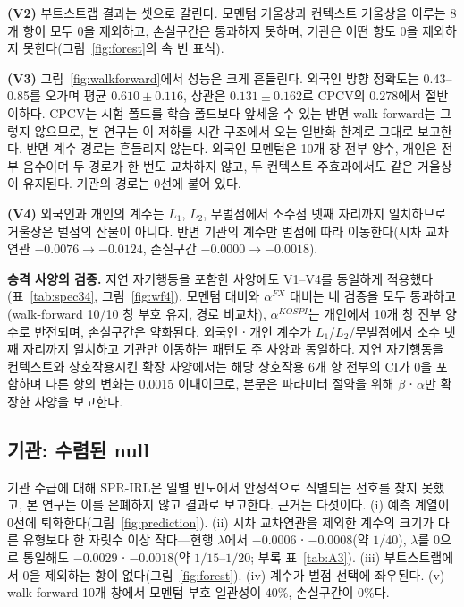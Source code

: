 \textbf{(V2)} 부트스트랩 결과는 셋으로 갈린다. 모멘텀 거울상과 컨텍스트 거울상을
이루는 8개 항이 모두 0을 제외하고, 손실구간은 통과하지 못하며, 기관은 어떤 항도
0을 제외하지 못한다(그림~\ref{fig:forest}의 속 빈 표식).

\textbf{(V3)} 그림~\ref{fig:walkforward}에서 성능은 크게 흔들린다. 외국인 방향
정확도는 0.43--0.85를 오가며 평균 $0.610\pm0.116$, 상관은 $0.131\pm0.162$로 CPCV의
0.278에서 절반 이하다. CPCV는 시험 폴드를 학습 폴드보다 앞세울 수 있는 반면
walk-forward는 그렇지 않으므로, 본 연구는 이 저하를 시간 구조에서 오는 일반화
한계로 그대로 보고한다. 반면 계수 경로는 흔들리지 않는다. 외국인 모멘텀은 10개 창
전부 양수, 개인은 전부 음수이며 두 경로가 한 번도 교차하지 않고, 두 컨텍스트
주효과에서도 같은 거울상이 유지된다. 기관의 경로는 0선에 붙어 있다.

\textbf{(V4)} 외국인과 개인의 계수는 $L_1$, $L_2$, 무벌점에서 소수점 넷째 자리까지
일치하므로 거울상은 벌점의 산물이 아니다. 반면 기관의 계수만 벌점에 따라
이동한다(시차 교차연관 $-0.0076\rightarrow-0.0124$, 손실구간
$-0.0000\rightarrow-0.0018$).

\textbf{승격 사양의 검증.} 지연 자기행동을 포함한 사양에도 V1--V4를 동일하게
적용했다(표~\ref{tab:spec34}, 그림~\ref{fig:wf4}). 모멘텀 대비와 $\alpha^{FX}$
대비는 네 검증을 모두 통과하고(walk-forward 10/10 창 부호 유지, 경로 비교차),
$\alpha^{KOSPI}$는 개인에서 10개 창 전부 양수로 반전되며, 손실구간은 약화된다.
외국인ㆍ개인 계수가 $L_1$/$L_2$/무벌점에서 소수 넷째 자리까지 일치하고 기관만
이동하는 패턴도 주 사양과 동일하다. 지연 자기행동을 컨텍스트와 상호작용시킨 확장
사양에서는 해당 상호작용 6개 항 전부의 CI가 0을 포함하며 다른 항의 변화는 0.0015
이내이므로, 본문은 파라미터 절약을 위해 $\beta$ㆍ$\alpha$만 확장한 사양을 보고한다.

\subsection{기관: 수렴된 null}
\label{sec:null}

기관 수급에 대해 SPR-IRL은 일별 빈도에서 안정적으로 식별되는 선호를 찾지 못했고,
본 연구는 이를 은폐하지 않고 결과로 보고한다. 근거는 다섯이다. (i) 예측 계열이 0선에
퇴화한다(그림~\ref{fig:prediction}). (ii) 시차 교차연관을 제외한 계수의 크기가 다른
유형보다 한 자릿수 이상 작다---현행 $\lambda$에서 $-0.0006$ㆍ$-0.0008$(약 $1/40$),
$\lambda$를 0으로 통일해도 $-0.0029$ㆍ$-0.0018$(약 $1/15$--$1/20$; 부록
표~\ref{tab:A3}). (iii) 부트스트랩에서 0을 제외하는 항이 없다(그림~\ref{fig:forest}).
(iv) 계수가 벌점 선택에 좌우된다. (v) walk-forward 10개 창에서 모멘텀 부호 일관성이
40\%, 손실구간이 0\%다.

